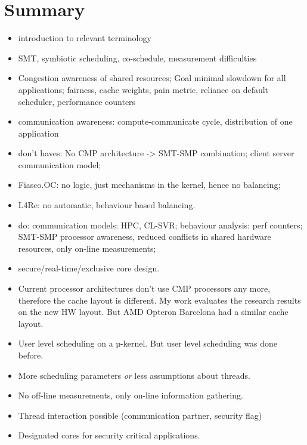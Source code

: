 \section{Summary}
\label{state:summ}

\begin{itemize}
  \item introduction to relevant terminology
  \item SMT, symbiotic scheduling, co-schedule, measurement difficulties
  \item Congestion awareness of shared resources; Goal minimal slowdown for all
    applications; fairness, cache weights, pain metric, reliance on default
    scheduler, performance counters
  \item communication awareness: compute-communicate cycle, distribution of one
    application
  \item don't haves: No CMP architecture -> SMT-SMP combination; client server
    communication model;
  \item Fiasco.OC: no logic, just mechanisms in the kernel, hence no balancing;
  \item L4Re: no automatic, behaviour based balancing.
  \item do: communication models: HPC, CL-SVR; behaviour analysis: perf
    counters; SMT-SMP processor awareness, reduced conflicts in shared hardware
    resources, only on-line measurements;
  \item secure/real-time/exclusive core design.
\end{itemize}


\begin{itemize}
  \item Current processor architectures don't use CMP processors any more, therefore
    the cache layout is different. My work evaluates the research results on the
    new HW layout. But AMD Opteron Barcelona had a similar cache layout.
  \item User level scheduling on a $µ$-kernel. But user level scheduling was
    done before.
  \item More scheduling parameters \textit{or} less assumptions about threads.
  \item No off-line measurements, only on-line information gathering.
  \item Thread interaction possible (communication partner, security flag)
  \item Designated cores for security critical applications.
\end{itemize}


